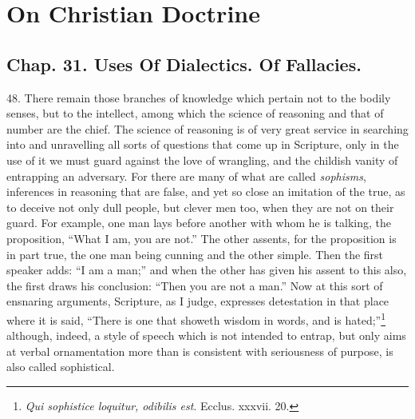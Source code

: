 
\author{Augustine of Hippo}
\chapter[On Christian Doctrine, bk 2.31--2.34]{On Christian
Doctrine}

\section{Chap. 31. Uses Of Dialectics. Of Fallacies.}

48. There remain those branches of knowledge which pertain not to the
bodily senses, but to the intellect, among which the science of
reasoning and that of number are the chief. The science of reasoning
is of very great service in searching into and unravelling all sorts
of questions that come up in Scripture, only in the use of it we must
guard against the love of wrangling, and the childish vanity of
entrapping an adversary. For there are many of what are called
\textit{sophisms}, inferences in reasoning that are false, and yet so
close an imitation of the true, as to deceive not only dull people,
but clever men too, when they are not on their guard. For example, one
man lays before another with whom he is talking, the proposition,
``What I am, you are not.'' The other assents, for the proposition is
in part true, the one man being cunning and the other simple. Then the
first speaker adds: ``I am a man;'' and when the other has given his
assent to this also, the first draws his conclusion: ``Then you are
not a man.'' Now at this sort of ensnaring arguments, Scripture, as I
judge, expresses detestation in that place where it is said, ``There
is one that showeth wisdom in words, and is
hated;''\footnote{\textit{Qui sophistice loquitur, odibilis est}.
Ecclus. xxxvii. 20.} although, indeed, a style of speech which is not
intended to entrap, but  only aims at verbal ornamentation
more than is consistent with seriousness of purpose, is also called
sophistical.

